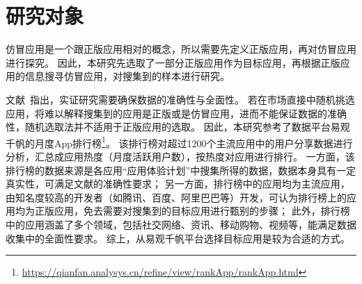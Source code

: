 




\section{研究对象}
仿冒应用是一个跟正版应用相对的概念，所以需要先定义正版应用，再对仿冒应用进行探究。
因此，本研究先选取了一部分正版应用作为目标应用，再根据正版应用的信息搜寻仿冒应用，对搜集到的样本进行研究。

文献~\cite{kitchenham2002preliminary}指出，实证研究需要确保数据的准确性与全面性。
若在市场直接中随机挑选应用，将难以解释搜集到的应用是正版或是仿冒应用，进而不能保证数据的准确性，随机选取法并不适用于正版应用的选取。
因此，本研究参考了数据平台易观千帆的月度App排行榜\footnote{\url{https://qianfan.analysys.cn/refine/view/rankApp/rankApp.html}}。
该排行榜对超过1200个主流应用中的用户分享数据进行分析，汇总成应用热度（月度活跃用户数），按热度对应用进行排行。
一方面，该排行榜的数据来源是各应用``应用体验计划''中搜集所得的数据，数据本身具有一定真实性，可满足文献的准确性要求；
另一方面，排行榜中的应用均为主流应用，由知名度较高的开发者（如腾讯、百度、阿里巴巴等）开发，可认为排行榜上的应用均为正版应用，免去需要对搜集到的目标应用进行甄别的步骤；
此外，排行榜中的应用涵盖了多个领域，包括社交网络、资讯、移动购物、视频等，能满足数据收集中的全面性要求。
综上，从易观千帆平台选择目标应用是较为合适的方式。

